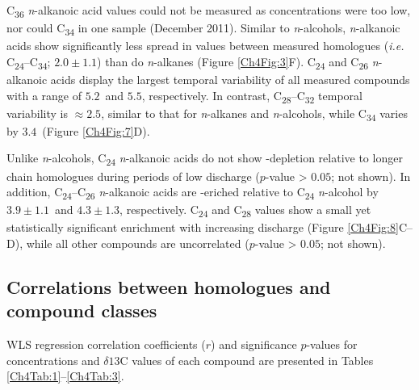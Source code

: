C\textsubscript{36} \textit{n}-alkanoic acid  values could not be measured as concentrations were too low, nor could C\textsubscript{34} in one sample (December 2011). Similar to \textit{n}-alcohols, \textit{n}-alkanoic acids show significantly less spread in  values between measured homologues (\textit{i.e.} C\textsubscript{24}--C\textsubscript{34}; $2.0 \pm 1.1$\textperthousand) than do \textit{n}-alkanes (Figure \ref{Ch4Fig:3}F). C\textsubscript{24} and C\textsubscript{26} \textit{n}-alkanoic acids display the largest temporal variability of all measured compounds with a range of $5.2$\textperthousand\ and $5.5$\textperthousand, respectively. In contrast, C\textsubscript{28}--C\textsubscript{32} temporal variability is $\approx 2.5$\textperthousand, similar to that for \textit{n}-alkanes and \textit{n}-alcohols, while C\textsubscript{34} varies by $3.4$\textperthousand\ (Figure \ref{Ch4Fig:7}D).

Unlike \textit{n}-alcohols, C\textsubscript{24} \textit{n}-alkanoic acids do not show -depletion relative to longer chain homologues during periods of low discharge ($p$-value > $0.05$; not shown). In addition, C\textsubscript{24}--C\textsubscript{26} \textit{n}-alkanoic acids are -eriched relative to C\textsubscript{24} \textit{n}-alcohol by $3.9 \pm 1.1$\textperthousand\ and $4.3 \pm 1.3$\textperthousand, respectively. C\textsubscript{24} and C\textsubscript{28}  values show a small yet statistically significant enrichment with increasing discharge (Figure \ref{Ch4Fig:8}C--D), while all other compounds are uncorrelated ($p$-value > $0.05$; not shown).

\subsection{Correlations between homologues and compound classes}

WLS regression correlation coefficients ($r$) and significance $p$-values for concentrations and $\delta{13}$C values of each compound are presented in Tables \ref{Ch4Tab:1}--\ref{Ch4Tab:3}. 

